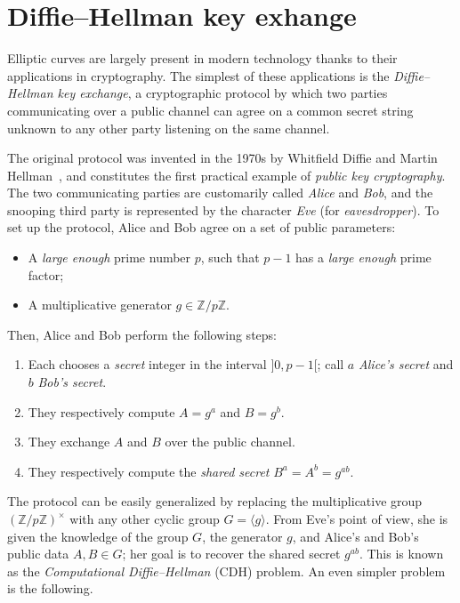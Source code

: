 \documentclass[10pt]{article}
\theoremstyle{plain}
\theoremstyle{definition}
\begin{document}
\section{Diffie--Hellman key exhange}
\label{sec:appl-diff-hellm}

Elliptic curves are largely present in modern technology thanks to
their applications in cryptography. %
The simplest of these applications is the \emph{Diffie--Hellman key
  exchange}, a cryptographic protocol by which two parties
communicating over a public channel can agree on a common secret
string unknown to any other party listening on the same channel.

The original protocol was invented in the 1970s by Whitfield Diffie
and Martin Hellman~\cite{DifHel76}, and constitutes the first practical
example of \emph{public key cryptography}. %
The two communicating parties are customarily called \emph{Alice} and
\emph{Bob}, and the snooping third party is represented by the
character \emph{Eve} (for \emph{eavesdropper}). %
To set up the protocol, Alice and Bob agree on a set of public
parameters:
\begin{itemize}
\item A \emph{large enough} prime number $p$, such that $p-1$ has a
  \emph{large enough} prime factor;
\item A multiplicative generator $g∈ℤ/pℤ$.
\end{itemize}

Then, Alice and Bob perform the following steps:
\begin{enumerate}
\item Each chooses a \emph{secret} integer in the interval $]0,p-1[$;
  call $a$ \emph{Alice's secret} and $b$ \emph{Bob's secret}.
\item They respectively compute $A=g^a$ and $B=g^b$.
\item They exchange $A$ and $B$ over the public channel.
\item They respectively compute the \emph{shared secret}
  $B^a=A^b=g^{ab}$.
\end{enumerate}

The protocol can be easily generalized by replacing the multiplicative
group $(ℤ/pℤ)^{×}$ with any other cyclic group $G=〈g〉$. %
From Eve's point of view, she is given the knowledge of the group $G$,
the generator $g$, and Alice's and Bob's public data $A,B∈G$; her goal
is to recover the shared secret $g^{ab}$. %
This is known as the \emph{Computational Diffie--Hellman} (CDH)
problem. %
An even simpler problem is the following.
\end{document}
